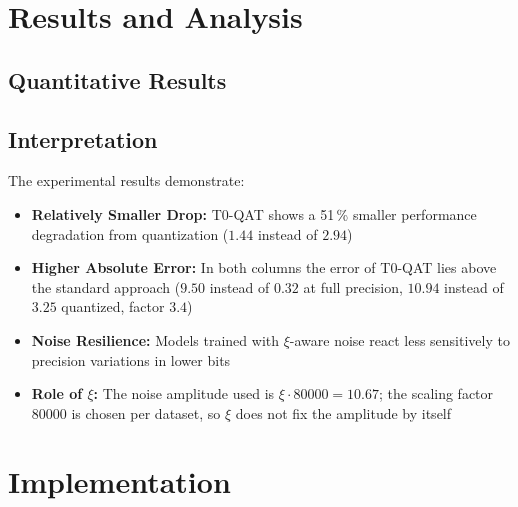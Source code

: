 	\section{Results and Analysis}
	
	\subsection{Quantitative Results}
	
	\begin{table}[h]
		\centering
		\caption{Performance comparison under quantization noise}
		\label{tab:results}
	\end{table}
	
	\subsection{Interpretation}
	
	The experimental results demonstrate:
	
	\begin{itemize}
		\item \textbf{Relatively Smaller Drop:} T0-QAT shows a 51\,\% smaller performance degradation from quantization ($1.44$ instead of $2.94$)
		\item \textbf{Higher Absolute Error:} In both columns the error of T0-QAT lies above the standard approach ($9.50$ instead of $0.32$ at full precision, $10.94$ instead of $3.25$ quantized, factor $3.4$)
		\item \textbf{Noise Resilience:} Models trained with $\xi$-aware noise react less sensitively to precision variations in lower bits
		\item \textbf{Role of $\xi$:} The noise amplitude used is $\xi \cdot 80000 = 10.67$; the scaling factor $80000$ is chosen per dataset, so $\xi$ does not fix the amplitude by itself
	\end{itemize}
	
	\section{Implementation}
	
